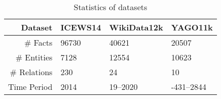 \begin{table}[htb]
\centering
\begin{minipage}{\columnwidthcaption}
\centering
\caption{Statistics of datasets}
\label{tab:dataset_stats}
\end{minipage}

\vspace{-3mm}
\begin{tabular}{r|M{0.22}M{0.22}M{0.21}} \hline
Dataset & \mbox{ICEWS14} & WikiData12k & YAGO11k \\
\hline
\# Facts & 96730 & 40621 & 20507\\
\# Entities & 7128 & 12554 & 10623\\
\# Relations & 230 & 24 & 10\\
Time Period & 2014 & 19--2020 & -431--2844\\
\hline
\end{tabular}
\end{table}